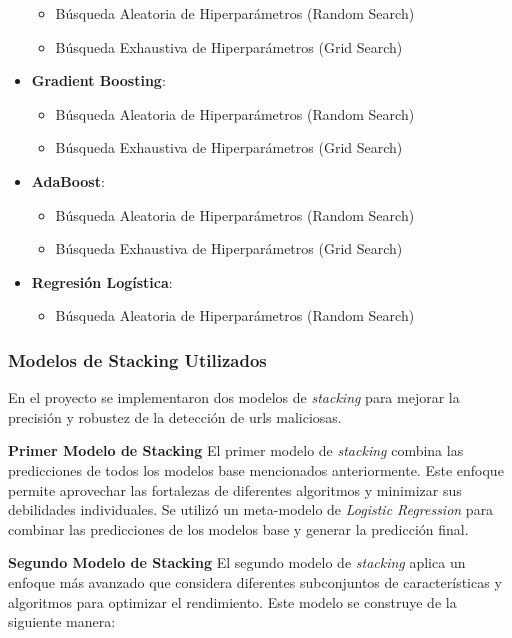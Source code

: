 \begin{itemize}
    \begin{itemize}
        \item Búsqueda Aleatoria de Hiperparámetros (Random Search)
        \item Búsqueda Exhaustiva de Hiperparámetros (Grid Search)
    \end{itemize}
    \item \textbf{Gradient Boosting}: 
    \begin{itemize}
        \item Búsqueda Aleatoria de Hiperparámetros (Random Search)
        \item Búsqueda Exhaustiva de Hiperparámetros (Grid Search)
    \end{itemize}
    \item \textbf{AdaBoost}: 
    \begin{itemize}
        \item Búsqueda Aleatoria de Hiperparámetros (Random Search)
        \item Búsqueda Exhaustiva de Hiperparámetros (Grid Search)
    \end{itemize}
    \item \textbf{Regresión Logística}: 
    \begin{itemize}
        \item Búsqueda Aleatoria de Hiperparámetros (Random Search)
    \end{itemize}
\end{itemize}



\subsubsection{Modelos de Stacking Utilizados}

En el proyecto se implementaron dos modelos de \textit{stacking} para mejorar la precisión y robustez de la detección de \glspl{url} maliciosas. 

\textbf{Primer Modelo de Stacking}
El primer modelo de \textit{stacking} combina las predicciones de todos los modelos base mencionados anteriormente. Este enfoque permite aprovechar las fortalezas de diferentes algoritmos y minimizar sus debilidades individuales. Se utilizó un meta-modelo de \textit{Logistic Regression} para combinar las predicciones de los modelos base y generar la predicción final.

\textbf{Segundo Modelo de Stacking}
El segundo modelo de \textit{stacking} aplica un enfoque más avanzado que considera diferentes subconjuntos de características y algoritmos para optimizar el rendimiento. Este modelo se construye de la siguiente manera:


